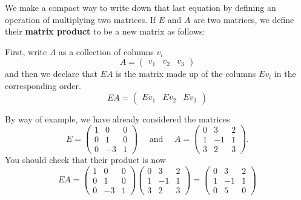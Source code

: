 \documentclass[10pt,]{book}
\newcommand{\terminology}[1]{\textbf{#1}}
\theoremstyle{plain}
\theoremstyle{definition}
\numberwithin{equation}{section}
\begin{document}
        We make a compact way to write down that last equation by defining an
        operation of multiplying two matrices.
        If \(E\) and \(A\) are two matrices, we define their
        \terminology{matrix product}
        to be a new matrix as follows:
\par

        First, write \(A\) as a collection of columns \(v_i\)
        \[
          A = \begin{pmatrix} v_1 &v_2 &v_3 \end{pmatrix}
        \]
        and then we declare that \(EA\) is the matrix made up of the columns
        \(Ev_i\) in the corresponding order.
        \[
          EA = \begin{pmatrix} Ev_1 &Ev_2 &Ev_3 \end{pmatrix}
        \]
\par

        By way of example, we have already considered the matrices
        \[
          E = \begin{pmatrix} 1 &0 &0 \\ 0 &1 &0 \\ 0 &-3 &1 \end{pmatrix} \quad \text{ and } \quad
          A = \begin{pmatrix} 0 &3 &2 \\ 1 &-1 &1 \\ 3 &2 &3 \end{pmatrix}.
        \]
        You should check that their product is now
        \[
          EA = \begin{pmatrix} 1 &0 &0 \\ 0 &1 &0 \\ 0 &-3 &1 \end{pmatrix}\begin{pmatrix} 0 &3 &2 \\ 1 &-1 &1 \\ 3 &2 &3 \end{pmatrix} =
          \begin{pmatrix} 0 &3 &2 \\ 1 &-1 &1 \\ 0 &5 &0 \end{pmatrix}
        \]
\par
\end{document}
